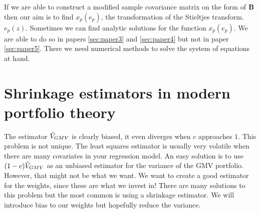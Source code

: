 \documentclass[oneside]{book}\usepackage{knitr}
\begin{document}
If we are able to construct a modified sample covariance matrix on the form of $\mathbf{B}$ then our aim is to find $x_p(e_p)$, the transformation of the Stieltjes transform. $e_p(z)$.
Sometimes we can find analytic solutions for the function $x_p(e_p)$. 
We are able to do so in papers \ref{sec:paper3} and \ref{sec:paper4} but not in paper \ref{sec:paper5}. 
There we need numerical methods to solve the system of equations at hand.

\section{Shrinkage estimators in modern portfolio theory}
The estimator $\hat{V}_{GMV}$ is clearly biased, it even diverges when $c$ approaches $1$. 
This problem is not unique. 
The least squares estimator is usually very volatile when there are many covariates in your regression model. 
An easy solution is to use $(1-c)\hat{V}_{GMV}$ as an unbiased estimator for the variance of the GMV portfolio.
However, that might not be what we want. 
We want to create a good estimator for the weights, since these are what we invest in! 
There are many solutions to this problem but the most common is using a shrinkage estimator. 
We will introduce bias to our weights but hopefully reduce the variance.
\end{document}
